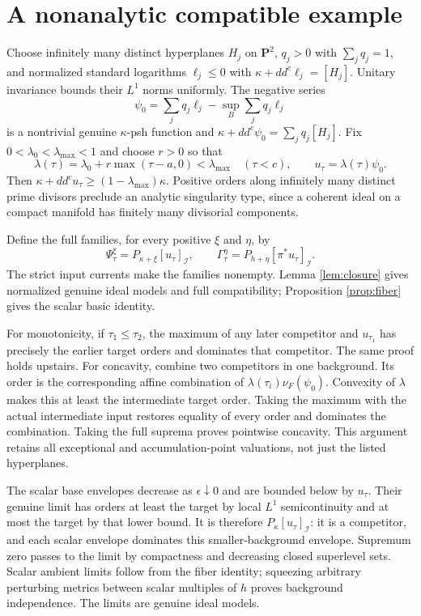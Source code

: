 \documentclass[11pt]{article}
\newcommand{\ddc}{dd^c}
\newcommand{\PI}[2]{P_{#1}[#2]_{\mathcal I}}
\begin{document}
\section{A nonanalytic compatible example}
Choose infinitely many distinct hyperplanes $H_j$ on $\mathbf P^2$,
$q_j>0$ with $\sum_jq_j=1$, and normalized standard logarithms
$\ell_j\leq0$ with $\kappa+\ddc\ell_j=[H_j]$. Unitary invariance
bounds their $L^1$ norms uniformly. The negative series
\[
 \psi_0=\sum_jq_j\ell_j-\sup_B\sum_jq_j\ell_j
\]
is a nontrivial genuine $\kappa$-psh function and
$\kappa+\ddc\psi_0=\sum_jq_j[H_j]$.
Fix $0<\lambda_0<\lambda_{\max}<1$ and choose $r>0$ so that
\[
 \lambda(\tau)=\lambda_0+r\max(\tau-a,0)<\lambda_{\max}
                      \quad(\tau<c),\qquad u_\tau=\lambda(\tau)\psi_0.
\]
Then $\kappa+\ddc u_\tau\geq(1-\lambda_{\max})\kappa$.
Positive orders along infinitely many distinct prime divisors preclude
an analytic singularity type, since a coherent ideal on a compact
manifold has finitely many divisorial components.

Define the full families, for every positive $\xi$ and $\eta$, by
\[
 \Psi_\tau^\xi=\PI{\kappa+\xi}{u_\tau},\qquad
 \Gamma_\tau^\eta=\PI{h+\eta}{\pi^*u_\tau}.
\]
The strict input currents make the families nonempty. Lemma
\ref{lem:closure} gives normalized genuine ideal models and full
compatibility; Proposition \ref{prop:fiber} gives the scalar basic identity.

For monotonicity, if $\tau_1\leq\tau_2$, the maximum of any later
competitor and $u_{\tau_1}$ has precisely the earlier target orders and
dominates that competitor. The same proof holds upstairs. For concavity,
combine two competitors in one background. Its order is the corresponding
affine combination of $\lambda(\tau_i)\nu_F(\psi_0)$. Convexity of
$\lambda$ makes this at least the intermediate target order. Taking the
maximum with the actual intermediate input restores equality of every
order and dominates the combination. Taking the full suprema proves
pointwise concavity. This argument retains all exceptional and
accumulation-point valuations, not just the listed hyperplanes.

The scalar base envelopes decrease as $\epsilon\downarrow0$ and are
bounded below by $u_\tau$. Their genuine limit has orders at least the
target by local $L^1$ semicontinuity and at most the target by that lower
bound. It is therefore $\PI{\kappa}{u_\tau}$: it is a competitor,
and each scalar envelope dominates this smaller-background envelope.
Supremum zero passes to the limit by compactness and decreasing closed
superlevel sets. Scalar ambient limits follow from the fiber identity;
squeezing arbitrary perturbing metrics between scalar multiples of $h$
proves background independence. The limits are genuine ideal models.
\end{document}
